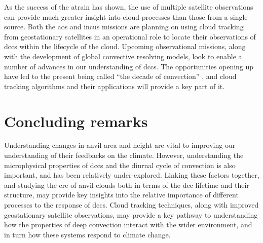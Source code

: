 As the success of the \acrshort{atrain} has shown, the use of multiple satellite observations can provide much greater insight into cloud processes than those from a single source.
Both the \acrshort{aos} and \acrshort{incus} missions are planning on using cloud tracking from geostationary satellites in an operational role to locate their observations of \acrshort{dcc}s within the lifecycle of the cloud.
Upcoming observational missions, along with the development of global convective resolving models, look to enable a number of advances in our understanding of \acrshort{dcc}s.
The opportunities opening up have led to the present being called ``the decade of convection'' \citep{vandenheever_tropical_2023}, and cloud tracking algorithms and their applications will provide a key part of it.




\section{Concluding remarks}

Understanding changes in anvil area and height are vital to improving our understanding of their feedbacks on the climate.
However, understanding the microphysical properties of \acrshort{dcc}s and the diurnal cycle of convection is also important, and has been relatively under-explored.
Linking these factors together, and studying the \acrshort{cre} of anvil clouds both in terms of the \acrshort{dcc} lifetime and their structure, may provide key insights into the relative importance of different processes to the response of \acrshort{dcc}s.
Cloud tracking techniques, along with improved geostationary satellite observations, may provide a key pathway to understanding how the properties of deep convection interact with the wider environment, and in turn how these systems respond to climate change.